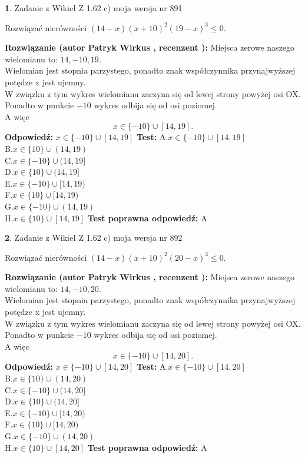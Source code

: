 \documentclass[12pt, a4paper]{article}
\theoremstyle{definition} %
\newtheorem{zad}{}
\newcommand{\zadStart}[1]{\begin{zad}#1\newline}
\newcommand{\zadStop}{\end{zad}}
\newcommand{\rozwStart}[2]{\noindent \textbf{Rozwiązanie (autor #1 , recenzent #2): }\newline}
\newcommand{\rozwStop}{\newline}
\newcommand{\odpStart}{\noindent \textbf{Odpowiedź:}\newline}
\newcommand{\odpStop}{\newline}
\newcommand{\testStart}{\noindent \textbf{Test:}\newline}
\newcommand{\testStop}{\newline}
\newcommand{\kluczStart}{\noindent \textbf{Test poprawna odpowiedź:}\newline}
\newcommand{\kluczStop}{\newline}
\begin{document}
\zadStart{Zadanie z Wikieł Z 1.62 c) moja wersja nr 891}

Rozwiązać nierówności $(14-x)(x+10)^{2}(19-x)^{3}\le0$.
\zadStop
\rozwStart{Patryk Wirkus}{}
Miejsca zerowe naszego wielomianu to: $14, -10, 19$.\\
Wielomian jest stopnia parzystego, ponadto znak współczynnika przy\linebreak najwyższej potędze x jest ujemny.\\ W związku z tym wykres wielomianu zaczyna się od lewej strony powyżej osi OX.\\
Ponadto w punkcie $-10$ wykres odbija się od osi poziomej.\\
A więc $$x \in \{-10\} \cup [14,19].$$
\rozwStop
\odpStart
$x \in \{-10\} \cup [14,19]$
\odpStop
\testStart
A.$x \in \{-10\} \cup [14,19]$\\
B.$x \in \{10\} \cup (14,19)$\\
C.$x \in \{-10\} \cup (14,19]$\\
D.$x \in \{10\} \cup (14,19]$\\
E.$x \in \{-10\} \cup [14,19)$\\
F.$x \in \{10\} \cup [14,19)$\\
G.$x \in \{-10\} \cup (14,19)$\\
H.$x \in \{10\} \cup [14,19]$
\testStop
\kluczStart
A
\kluczStop



\zadStart{Zadanie z Wikieł Z 1.62 c) moja wersja nr 892}

Rozwiązać nierówności $(14-x)(x+10)^{2}(20-x)^{3}\le0$.
\zadStop
\rozwStart{Patryk Wirkus}{}
Miejsca zerowe naszego wielomianu to: $14, -10, 20$.\\
Wielomian jest stopnia parzystego, ponadto znak współczynnika przy\linebreak najwyższej potędze x jest ujemny.\\ W związku z tym wykres wielomianu zaczyna się od lewej strony powyżej osi OX.\\
Ponadto w punkcie $-10$ wykres odbija się od osi poziomej.\\
A więc $$x \in \{-10\} \cup [14,20].$$
\rozwStop
\odpStart
$x \in \{-10\} \cup [14,20]$
\odpStop
\testStart
A.$x \in \{-10\} \cup [14,20]$\\
B.$x \in \{10\} \cup (14,20)$\\
C.$x \in \{-10\} \cup (14,20]$\\
D.$x \in \{10\} \cup (14,20]$\\
E.$x \in \{-10\} \cup [14,20)$\\
F.$x \in \{10\} \cup [14,20)$\\
G.$x \in \{-10\} \cup (14,20)$\\
H.$x \in \{10\} \cup [14,20]$
\testStop
\kluczStart
A
\kluczStop
\end{document}
